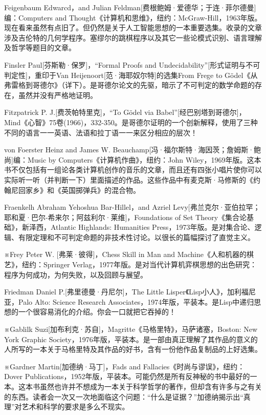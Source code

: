 \documentclass[
  12pt,
  twoside,
  openright,
  oldfontcommands,
]{memoir}
\begin{document}
Feigenbaum Edwarcd，and Julian Feldman{[}费根鲍姆·爱德华；于连·菲尔德曼{]}编：Computers and Thought《计算机和思维》，纽约：McGraw-Hill，1963年版。现在看来虽然有点旧了。但仍然是关于人工智能思想的一本重要选集。收录的文章涉及吉伦特的几何学程序。塞缪尔的跳棋程序以及其它一些论模式识别、语言理解及哲学等题目的文章。

Finsler Paul{[}芬斯勒·保罗{]}，``Formal Proofs and Undecidability''{[}形式证明与不可判定性{]}，重印于Van Heijenoort{[}范·海耶奴尔特{]}的选集From Frege to Gödel《从弗雷格到哥德尔》（详下）。是哥德尔论文的先驱，暗示了不可判定的数学命题的存在，虽然并没有严格地证明。

Fitzpatrick P. J.{[}费茨帕特里克{]}，``To Gödel via Babel''{[}经巴别塔到哥德尔{]}，Mind《心智》75卷(1966)，332-350。是哥德尔证明的一个创新解释，使用了三种不同的语言一一英语、法语和拉丁语一一来区分相应的层次！

von Foerster Heinz and James W. Beauchamp{[}冯·福尔斯特·海因茨；詹姆斯·鲍尚{]}编：Music by Computers《计算机作曲》，纽约：John Wiley，1969年版。这本书不仅包括有一组论各类计算机创作的音乐的文章，而且还有四张小唱片使你可以实际听一听（并判断一下）里面描述的作品。这些作品中有麦克斯·马修斯的《约翰尼回家乡》和《英国掷弹兵》的混合物。

Fraenkelh Abraham Yehoshua Bar-Hillel，and Azriel Levy{[}弗兰克尔·亚伯拉罕；耶和夏·巴尔-希来尔；阿兹利尔·莱维{]}，Foundations of Set Theory《集合论基础》，新泽西，Atlantic Highlands: Humanities Press，1973年版。是对集合论、逻辑、有限定理和不可判定命题的非技术性讨论。以很长的篇幅探讨了直觉主义。

※Frey Peter W. {[}弗莱·彼得{]}，Chess Skill in Man and Machine《人和机器的棋艺》，纽约：Springer Verlag，1977年版。是对当代计算机弈棋思想的出色研究：程序为何成功，为何失败，以及回顾与展望。

Friedman Daniel P.{[}弗里德曼·丹尼尔{]}，The Little Lisper《Lisp小人》，加利福尼亚，Palo Alto: Science Research Associates，1974年版，平装本。是Lisp中递归思想的一个很容易消化的介绍。你会一口就把它吞掉的！

※Gablilk Suzi{[}加布利克·苏自{]}，Magritte《马格里特》，马萨诸塞，Boston: New York Graphic Society，1976年版，平装本。是一部由真正理解了其作品的意义的人所写的一本关于马格里特及其作品的好书，含有一份他作品复制品的上好选集。

※Gardner Martin{[}加德纳·马丁{]}，Fads and Fallacies《时尚与谬误》，纽约：Dover Publications，1952年版，平装本。可能仍然是所有反神秘的书中最好的一本。这本书虽然也许并不想成为一本关于科学哲学的著作，但却含有许多与之有关的东西。读者会一次又一次地面临这个问题：``什么是证据？''加德纳揭示出``真理''对艺术和科学的要求是多么不现实。
\end{document}
